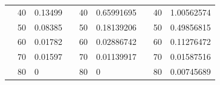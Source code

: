 \begin{table}[h]
\begin{tabular}{|cclcclccl|}
\rowcolor[HTML]{DDFDFF} 
\multicolumn{1}{|c|}{\cellcolor[HTML]{FFFFC7}}                                & \multicolumn{1}{c|}{\cellcolor[HTML]{DDFDFF}40}        & \multicolumn{1}{l|}{\cellcolor[HTML]{DDFDFF}0.13499}    & \multicolumn{1}{c|}{\cellcolor[HTML]{FFFFC7}}                                & \multicolumn{1}{c|}{\cellcolor[HTML]{DDFDFF}40}        & \multicolumn{1}{l|}{\cellcolor[HTML]{DDFDFF}0.65991695} & \multicolumn{1}{c|}{\cellcolor[HTML]{FFFFC7}}                                & \multicolumn{1}{c|}{\cellcolor[HTML]{DDFDFF}40}        & 1.00562574 \\ \cline{2-3} \cline{5-6} \cline{8-9} 
\rowcolor[HTML]{DAE8FC} 
\multicolumn{1}{|c|}{\cellcolor[HTML]{FFFFC7}}                                & \multicolumn{1}{c|}{\cellcolor[HTML]{DAE8FC}50}        & \multicolumn{1}{l|}{\cellcolor[HTML]{DAE8FC}0.08385}    & \multicolumn{1}{c|}{\cellcolor[HTML]{FFFFC7}}                                & \multicolumn{1}{c|}{\cellcolor[HTML]{DAE8FC}50}        & \multicolumn{1}{l|}{\cellcolor[HTML]{DAE8FC}0.18139206} & \multicolumn{1}{c|}{\cellcolor[HTML]{FFFFC7}}                                & \multicolumn{1}{c|}{\cellcolor[HTML]{DAE8FC}50}        & 0.49856815 \\ \cline{2-3} \cline{5-6} \cline{8-9} 
\rowcolor[HTML]{DDFDFF} 
\multicolumn{1}{|c|}{\cellcolor[HTML]{FFFFC7}}                                & \multicolumn{1}{c|}{\cellcolor[HTML]{DDFDFF}60}        & \multicolumn{1}{l|}{\cellcolor[HTML]{DDFDFF}0.01782}    & \multicolumn{1}{c|}{\cellcolor[HTML]{FFFFC7}}                                & \multicolumn{1}{c|}{\cellcolor[HTML]{DDFDFF}60}        & \multicolumn{1}{l|}{\cellcolor[HTML]{DDFDFF}0.02886742} & \multicolumn{1}{c|}{\cellcolor[HTML]{FFFFC7}}                                & \multicolumn{1}{c|}{\cellcolor[HTML]{DDFDFF}60}        & 0.11276472 \\ \cline{2-3} \cline{5-6} \cline{8-9} 
\rowcolor[HTML]{DAE8FC} 
\multicolumn{1}{|c|}{\cellcolor[HTML]{FFFFC7}}                                & \multicolumn{1}{c|}{\cellcolor[HTML]{DAE8FC}70}        & \multicolumn{1}{l|}{\cellcolor[HTML]{DAE8FC}0.01597}    & \multicolumn{1}{c|}{\cellcolor[HTML]{FFFFC7}}                                & \multicolumn{1}{c|}{\cellcolor[HTML]{DAE8FC}70}        & \multicolumn{1}{l|}{\cellcolor[HTML]{DAE8FC}0.01139917} & \multicolumn{1}{c|}{\cellcolor[HTML]{FFFFC7}}                                & \multicolumn{1}{c|}{\cellcolor[HTML]{DAE8FC}70}        & 0.01587516 \\ \cline{2-3} \cline{5-6} \cline{8-9} 
\rowcolor[HTML]{DDFDFF} 
\multicolumn{1}{|c|}{\cellcolor[HTML]{FFFFC7}}                                & \multicolumn{1}{c|}{\cellcolor[HTML]{DDFDFF}80}        & \multicolumn{1}{l|}{\cellcolor[HTML]{DDFDFF}0}          & \multicolumn{1}{c|}{\cellcolor[HTML]{FFFFC7}}                                & \multicolumn{1}{c|}{\cellcolor[HTML]{DDFDFF}80}        & \multicolumn{1}{l|}{\cellcolor[HTML]{DDFDFF}0}          & \multicolumn{1}{c|}{\cellcolor[HTML]{FFFFC7}}                                & \multicolumn{1}{c|}{\cellcolor[HTML]{DDFDFF}80}        & 0.00745689 \\ \cline{2-3} \cline{5-6} \cline{8-9} 

\end{tabular}
\end{table}

